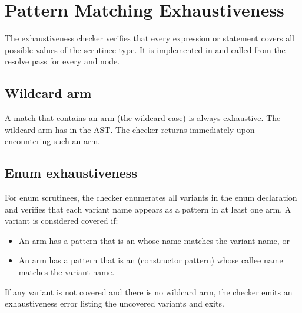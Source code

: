\chapter{Pattern Matching Exhaustiveness}
\label{chap:16-exhaustiveness}

\pnum
The exhaustiveness checker verifies that every  expression or
statement covers all possible values of the scrutinee type.  It is implemented
in  and called from the resolve pass for
every  and  node.

\section{Wildcard arm}
\label{sec:exh-wildcard}

\pnum
A match that contains an  arm (the wildcard case) is always
exhaustive.  The wildcard arm has  in the AST.  The
checker returns immediately upon encountering such an arm.

\section{Enum exhaustiveness}
\label{sec:exh-enum}

\pnum
For enum scrutinees, the checker enumerates all variants in the enum
declaration and verifies that each variant name appears as a pattern in at
least one arm.  A variant is considered covered if:
\begin{itemize}
\item An arm has a pattern that is an  whose name
  matches the variant name, or
\item An arm has a pattern that is an  (constructor pattern)
  whose callee name matches the variant name.
\end{itemize}

\pnum
If any variant is not covered and there is no wildcard arm, the checker emits an
exhaustiveness error listing the uncovered variants and exits.

